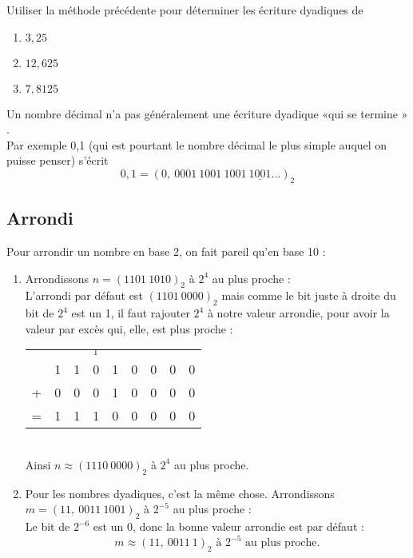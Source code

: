\begin{exercice}[]
	Utiliser la méthode précédente pour déterminer les écriture dyadiques de
	\begin{enumerate}
		\item 	$3,25$
		\item 	$12,625$
		\item 	$7,8125$
	\end{enumerate}
\end{exercice}

\begin{remarque}[]
	Un nombre décimal n'a pas généralement une écriture dyadique «qui se termine » .\\
	Par exemple 0,1 (qui est pourtant le nombre décimal le plus simple auquel on puisse penser) s'écrit
	$$0,1 = (0,\ 0001\ 1001\ 1001\ \underline{1001} ...)_2$$
\end{remarque}

\subsection{Arrondi}

Pour arrondir un nombre en base 2, on fait pareil qu'en base 10 :

\begin{exemple}[s]
	\begin{enumerate}
		\item 	Arrondissons $n=(1101\ 1010)_2$ à $2^4$ au plus proche :\\
		      L'arrondi par défaut est $(1101\ 0000)_2$ mais comme le bit juste à droite du bit de $2^4$ est un 1, il faut rajouter $2^4$ à
		      notre valeur arrondie, pour avoir la valeur par excès qui, elle, est plus proche :
		      \begin{center}
			      \begin{tabular}{ccccccccc}
				        &   &   & $_1$ &   &   &   &   &   \\
				        & 1 & 1 & 0    & 1 & 0 & 0 & 0 & 0 \\
				      + & 0 & 0 & 0    & 1 & 0 & 0 & 0 & 0 \\
				      \hline
				      = & 1 & 1 & 1    & 0 & 0 & 0 & 0 & 0 \\
			      \end{tabular} \\[2em]

			      Ainsi $n\approx (1110\ 0000)_2$ à $2^4$ au plus proche.
		      \end{center}
		\item 	Pour les nombres dyadiques, c'est la même chose. Arrondissons $m=(11,\ 0011\ 1001)_2$ à $2^{-5}$ au plus proche :\\
		      Le bit de $2^{-6}$ est un 0, donc la bonne valeur arrondie est par défaut :
		      $$m\approx(11,\ 0011\ 1)_2\textrm{ à }2^{-5}\textrm{ au plus proche.}$$
	\end{enumerate}
\end{exemple}

